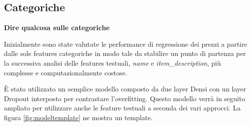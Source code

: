 



\subsection{Categoriche}
\textbf{Dire qualcosa sulle categoriche}

Inizialmente sono state valutate le performance di regressione dei prezzi a
partire dalle sole features categoriche in modo tale da stabilire un punto di
partenza per la successiva analisi delle features testuali, \textit{name} e
\textit{item\_description}, più complesse e computazionalmente costose.

È stato utilizzato un semplice modello composto da due layer Densi con un layer
Dropout interposto per contrastare l'overfitting.
Questo modello verrà in seguito ampliato per utilizzare anche le feature
testuali a seconda dei vari approcci.
La figura \ref{fig:modeltemplate} ne mostra un template.

